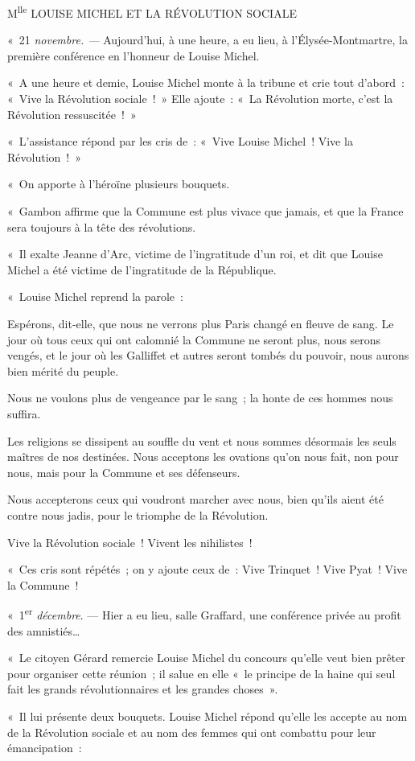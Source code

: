 \documentclass[french,twoside]{book} %
\newcommand{\astertri}{\medskip\par\centerline{\color{rubric}\large\selectfont{\syms ✻\,✻\,✻}}\medskip\par}%
\newenvironment{quoteblock}%
  {\begin{quoting}}
  {\end{quoting}}
\newenvironment{quotebar}{%
    \def\FrameCommand{{\color{rubric!10!}\vrule width 0.5em} \hspace{0.9em}}%
    \def\OuterFrameSep{\itemsep} %
    \MakeFramed {\advance\hsize-\width \FrameRestore}
  }%
  {%
    \endMakeFramed
  }
\renewenvironment{quoteblock}%
  {%
    \savenotes
    \setstretch{0.9}
    \normalfont
    \begin{quotebar}
  }
  {%
    \end{quotebar}
    \spewnotes
  }
\begin{document}
\begin{quoteblock}
 \noindent M\textsuperscript{lle} LOUISE MICHEL ET LA RÉVOLUTION SOCIALE\par
 \bigbreak
 \noindent « 21 \emph{novembre. — } Aujourd’hui, à une heure, a eu lieu, à l’Élysée-Montmartre, la première conférence en l’honneur de Louise Michel.\par
 « A une heure et demie, Louise Michel monte à la tribune et crie tout d’abord : « Vive la Révolution sociale ! » Elle ajoute : « La Révolution morte, c’est la Révolution ressuscitée ! »\par
 « L’assistance répond par les cris de : « Vive Louise Michel ! Vive la Révolution ! »\par
 « On apporte à l’héroïne plusieurs bouquets.\par
 « Gambon affirme que la Commune est plus vivace que jamais, et que la France sera toujours à la tête des révolutions.\par
 « Il exalte Jeanne d’Arc, victime de l’ingratitude d’un roi, et dit que Louise Michel a été victime de l’ingratitude de la République.\par
 « Louise Michel reprend la parole :\par
   
\begin{quoteblock}
 \noindent Espérons, dit-elle, que nous ne verrons plus Paris changé en fleuve de sang. Le jour où tous ceux qui ont calomnié la Commune ne seront plus, nous serons vengés, et le jour où les Galliffet et autres seront tombés du pouvoir, nous aurons bien mérité du peuple.\par
 Nous ne voulons plus de vengeance par le sang ; la honte de ces hommes nous suffira.\par
 Les religions se dissipent au souffle du vent et nous sommes désormais les seuls maîtres de nos destinées. Nous acceptons les ovations qu’on nous fait, non pour nous, mais pour la Commune et ses défenseurs.\par
 
\astertri

 \noindent Nous accepterons ceux qui voudront marcher avec nous, bien qu’ils aient été contre nous jadis, pour le triomphe de la Révolution.\par
 Vive la Révolution sociale ! Vivent les nihilistes !
 \end{quoteblock}

 \noindent « Ces cris sont répétés ; on y ajoute ceux de : Vive Trinquet ! Vive Pyat ! Vive la Commune !\par
 \bigbreak
 \noindent « 1\textsuperscript{er} \emph{décembre}. — Hier a eu lieu, salle Graffard, une conférence privée au profit des amnistiés…\par
 « Le citoyen Gérard remercie Louise Michel du concours qu’elle veut bien prêter pour organiser cette réunion ; il salue en elle « le principe de la haine qui seul fait les grands révolutionnaires et les grandes choses ».\par
 « Il lui présente deux bouquets. Louise Michel répond qu’elle les accepte au nom de la Révolution sociale et au nom des femmes qui ont combattu pour leur émancipation :\par
   

\end{quoteblock}
\end{document}
